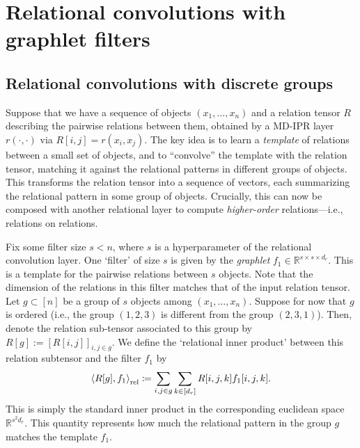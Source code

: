\section{Relational convolutions with graphlet filters}\label{sec:relconv}

\subsection{Relational convolutions with discrete groups}\label{ssec:relconv_discrete_groups}
Suppose that we have a sequence of objects $(x_1, \ldots, x_n)$ and a relation tensor $R$ describing the pairwise relations between them, obtained by a MD-IPR layer $r(\cdot, \cdot)$ via $R[i,j] = r(x_i, x_j)$. The key idea is to learn a \textit{template} of relations between a small set of objects, and to ``convolve'' the template with the relation tensor, matching it against the relational patterns in different groups of objects. This transforms the relation tensor into a sequence of vectors, each summarizing the relational pattern in some group of objects. Crucially, this can now be composed with another relational layer to compute \textit{higher-order} relations---i.e., relations on relations.

Fix some filter size $s < n$, where $s$ is a hyperparameter of the relational convolution layer. One `filter' of size $s$ is given by the \textit{graphlet} $f_1 \in \mathbb{R}^{s \times s \times d_r}$. This is a template for the pairwise relations between $s$ objects. Note that the dimension of the relations in this filter matches that of the input relation tensor. Let $g \subset [n]$ be a group of $s$ objects among $(x_1, \ldots, x_n)$. Suppose for now that $g$ is ordered (i.e., the group $(1, 2, 3)$ is different from the group $(2, 3, 1)$). Then, denote the relation sub-tensor associated to this group by $R[g] := [R[i,j]]_{i,j \in g}$. We define the `relational inner product' between this relation subtensor and the filter $f_1$ by
\begin{equation}\label{eq:relational_inner_prod_one_filt}
    \left\langle R[g], f_1 \right\rangle_\mathrm{rel} \coloneqq \sum_{i,j \in g} \sum_{k \in [d_r]} R[i,j,k] f_1[i,j,k].
\end{equation}
This is simply the standard inner product in the corresponding euclidean space $\mathbb{R}^{s^2 d_r}$. This quantity represents how much the relational pattern in the group $g$ matches the template $f_1$.



